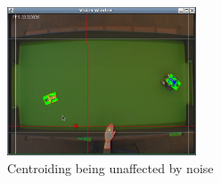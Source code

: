 \begin{figure}[h!]
  \caption{Centroiding being unaffected by noise}
  \label{vis3}
  \centering
    \includegraphics[width=0.5\textwidth]{randy_bins_after.png}
\end{figure}



